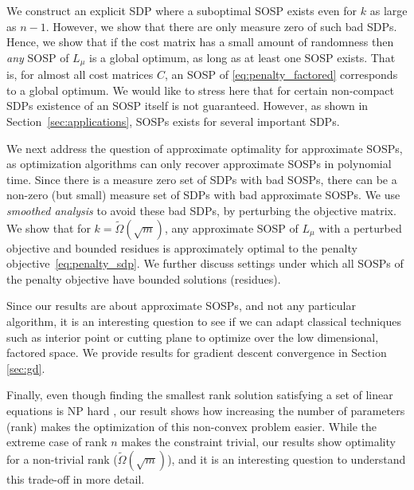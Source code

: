 We construct an explicit SDP where a suboptimal SOSP exists even for $k$ as large as $n-1$. However, we show that there are only measure zero of such bad SDPs. Hence, we show that if the cost matrix has a small amount of randomness then {\em any} SOSP of $L_\mu$ is a global optimum, as long as at least one SOSP exists. That is, for almost all cost matrices $C$, an SOSP of \eqref{eq:penalty_factored} corresponds to a global optimum. We would like to stress here that for certain non-compact SDPs existence of an SOSP itself is not guaranteed. However, as shown in Section~\ref{sec:applications}, SOSPs exists for several important SDPs. 

We next address the question of approximate optimality for approximate SOSPs, as optimization algorithms can only recover approximate SOSPs in polynomial time. Since there is a measure zero set of SDPs with bad SOSPs, there can be a non-zero (but small) measure set of SDPs with bad approximate SOSPs. We use {\em smoothed analysis} to avoid these bad SDPs, by perturbing the objective matrix. We show that for $k=\tilde \Omega(\sqrt{m})$, any approximate SOSP of  $L_{\mu}$  with a perturbed objective and bounded residues is approximately optimal to the penalty objective~\eqref{eq:penalty_sdp}. We further discuss settings under which all SOSPs of the penalty objective have bounded solutions (residues).

Since our results are about approximate SOSPs, and not any particular algorithm, it is an interesting question to see if we can adapt classical techniques such as interior point or cutting plane to optimize over the low dimensional, factored space. We provide results for gradient descent convergence in Section \ref{sec:gd}.

Finally, even though finding the smallest rank solution satisfying a set of linear equations is NP hard \citep{natarajan1995sparse}, our result shows how increasing the number of parameters (rank) makes the optimization of this non-convex problem easier. While the extreme case of rank $n$ makes the constraint trivial, our results show optimality for a non-trivial rank ($\tilde{\Omega}(\sqrt{m})$), and it is an interesting question to understand this trade-off in more detail.

